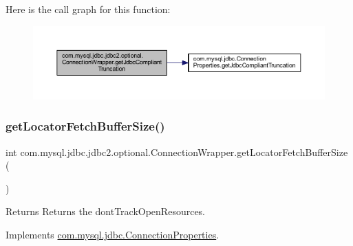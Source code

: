Here is the call graph for this function\+:
\nopagebreak
\begin{figure}[H]
\begin{center}
\leavevmode
\includegraphics[width=350pt]{classcom_1_1mysql_1_1jdbc_1_1jdbc2_1_1optional_1_1_connection_wrapper_a3daafc5194855212c6b6c0c30fb449b7_cgraph}
\end{center}
\end{figure}
\mbox{\label{classcom_1_1mysql_1_1jdbc_1_1jdbc2_1_1optional_1_1_connection_wrapper_a4232a575ece7c1b11147d5947bd7404c}} 
\subsubsection{\texorpdfstring{get\+Locator\+Fetch\+Buffer\+Size()}{getLocatorFetchBufferSize()}}
{\footnotesize\ttfamily int com.\+mysql.\+jdbc.\+jdbc2.\+optional.\+Connection\+Wrapper.\+get\+Locator\+Fetch\+Buffer\+Size (\begin{DoxyParamCaption}{ }\end{DoxyParamCaption})}

\begin{DoxyReturn}{Returns}
Returns the dont\+Track\+Open\+Resources. 
\end{DoxyReturn}


Implements \mbox{\hyperlink{interfacecom_1_1mysql_1_1jdbc_1_1_connection_properties_a9e88b2b4823f85f1ce0a95b4a7b9b5d5}{com.\+mysql.\+jdbc.\+Connection\+Properties}}.

